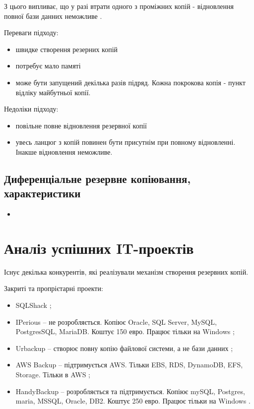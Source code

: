 З цього випливає, що у разі втрати одного з проміжних копій - відновлення повної бази данних неможливе \cite{backup2015incrdiff}.

Переваги підходу:
\begin{itemize}
    \item швидке створення резерних копій
    \item потребує мало памяті
    \item може бути запущений декілька разів підряд. Кожна покрокова копія - пункт відліку майбутньої копії.
\end{itemize}

Недоліки підходу:
\begin{itemize}
    \item повільне повне відновлення резервної копії
    \item увесь ланцюг з копій повинен бути присутнім при повному відновленні. Інакше відновлення неможливе.
\end{itemize}

\subsection{Диференціальне резервне копіювання, характеристики}



\begin{itemize}
    \item 
\end{itemize}

\section{Аналіз успішних IT-проектів}
Існує декілька конкурентів, які реалізували механізм створення резервних копій.

Закриті та пропрієтарні проекти:
\begin{itemize}
    \item SQLShack \cite{consqlshack};
    \item IPerious -- не розробляється. 
    Копіює Oracle, SQL Server, MySQL, PostgresSQL, MariaDB. Коштує 150 евро. 
    Працює тільки на Windows \cite{coniperius};
    \item Urbackup -- створює повну копію файлової системи, а не бази данних \cite{conurbackup};
    \item AWS Backup -- підтримується AWS. Тільки EBS, RDS, DynamoDB, EFS, Storage. Тільки в AWS \cite{conawsbackup};
    \item HandyBackup -- розробляється та підтримується.
    Копіює mySQL, Postgres, maria, MSSQL, Oracle, DB2. Коштує 250 евро. Працює тільки на Windows \cite{conhandybackup}.
\end{itemize}

